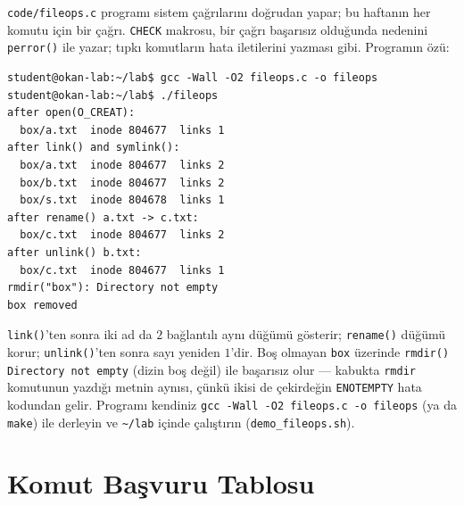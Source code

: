 \documentclass[11pt,a4paper]{article}
\newcommand{\cmd}[1]{\texttt{#1}}
\begin{document}
\cmd{code/fileops.c} programı sistem çağrılarını doğrudan yapar; bu haftanın her komutu için bir çağrı. \texttt{CHECK} makrosu, bir çağrı başarısız olduğunda nedenini \cmd{perror()} ile yazar; tıpkı komutların hata iletilerini yazması gibi. Programın özü:



\begin{lstlisting}[style=term]
student@okan-lab:~/lab$ gcc -Wall -O2 fileops.c -o fileops
student@okan-lab:~/lab$ ./fileops
after open(O_CREAT):
  box/a.txt  inode 804677  links 1
after link() and symlink():
  box/a.txt  inode 804677  links 2
  box/b.txt  inode 804677  links 2
  box/s.txt  inode 804678  links 1
after rename() a.txt -> c.txt:
  box/c.txt  inode 804677  links 2
after unlink() b.txt:
  box/c.txt  inode 804677  links 1
rmdir("box"): Directory not empty
box removed
\end{lstlisting}

\cmd{link()}'ten sonra iki ad da $2$ bağlantılı aynı düğümü gösterir; \cmd{rename()} düğümü korur; \cmd{unlink()}'ten sonra sayı yeniden $1$'dir. Boş olmayan \texttt{box} üzerinde \cmd{rmdir()} \texttt{Directory not empty} (dizin boş değil) ile başarısız olur --- kabukta \cmd{rmdir} komutunun yazdığı metnin aynısı, çünkü ikisi de çekirdeğin \texttt{ENOTEMPTY} hata kodundan gelir. Programı kendiniz \cmd{gcc -Wall -O2 fileops.c -o fileops} (ya da \cmd{make}) ile derleyin ve \texttt{\textasciitilde/lab} içinde çalıştırın (\cmd{demo\_fileops.sh}).

\section{Komut Başvuru Tablosu}
\end{document}
